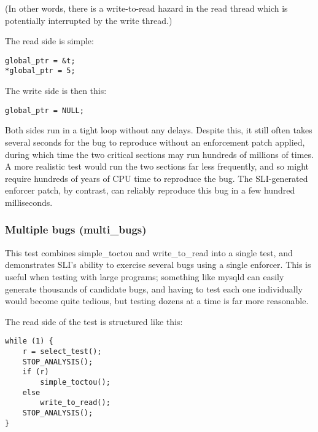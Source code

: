 (In other words, there is a write-to-read hazard in the read thread
which is potentially interrupted by the write thread.)

The read side is simple:

\begin{verbatim}
global_ptr = &t;
*global_ptr = 5;
\end{verbatim}

The write side is then this:

\begin{verbatim}
global_ptr = NULL;
\end{verbatim}

Both sides run in a tight loop without any delays.  Despite this, it
still often takes several seconds for the bug to reproduce without an
enforcement patch applied, during which time the two critical sections
may run hundreds of millions of times.  A more realistic test would
run the two sections far less frequently, and so might require
hundreds of years of CPU time to reproduce the bug.  The SLI-generated
enforcer patch, by contrast, can reliably reproduce this bug in a few
hundred milliseconds.


\subsubsection{Multiple bugs (multi\_bugs)}

This test combines simple\_toctou and write\_to\_read into a single
test, and demonstrates SLI's ability to exercise several bugs using a
single enforcer.  This is useful when testing with large programs;
something like mysqld can easily generate thousands of candidate bugs,
and having to test each one individually would become quite tedious,
but testing dozens at a time is far more reasonable.

The read side of the test is structured like this:

\begin{verbatim}
while (1) {
    r = select_test();
    STOP_ANALYSIS();
    if (r)
        simple_toctou();
    else
        write_to_read();
    STOP_ANALYSIS();
}
\end{verbatim}

